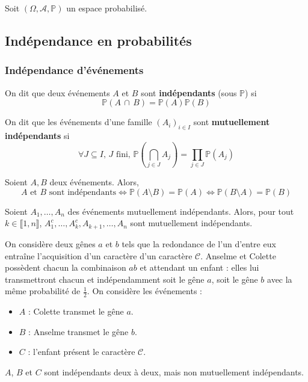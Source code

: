 



  Soit $(\Omega, \mathcal{A}, \mathbb{P})$ un espace probabilisé.

  \subsection{Indépendance en probabilités}

  \subsubsection{Indépendance d'événements}


  \begin{definition}
    On dit que deux événements $A$ et $B$ sont \textbf{indépendants} (sous $\mathbb{P}$) si
    \[ \mathbb{P}(A \, \cap \, B) = \mathbb{P}(A) \mathbb{P}(B) \]
  \end{definition}

  \begin{definition}
    On dit que les événements d'une famille $(A_i)_{i \in I}$ sont \textbf{mutuellement indépendants} si
    \[ \forall J \subseteq I, \, J \text{ fini}, \, \mathbb{P}\left( \bigcap_{j \in J} A_j \right) = \prod_{j \in J} \mathbb{P}(A_j) \]
  \end{definition}


  \begin{proposition}
    Soient $A, B$ deux événements. Alors,
    \[ A \text{ et } B \text{ sont indépendants} \iff \mathbb{P}(A \setminus B) = \mathbb{P}(A) \iff \mathbb{P}(B \setminus A) = \mathbb{P}(B) \]
  \end{proposition}

  \begin{proposition}
    Soient $A_1, \dots, A_n$ des événements mutuellement indépendants. Alors, pour tout $k \in \llbracket 1, n \rrbracket$, $A_1^c, \dots, A_k^c, A_{k+1}, \dots, A_n$ sont mutuellement indépendants.
  \end{proposition}

  \begin{example}
    On considère deux gênes $a$ et $b$ tels que la redondance de l'un d'entre eux entraîne l'acquisition d'un caractère d'un caractère $\mathcal{C}$. Anselme et Colette possèdent chacun la combinaison $ab$ et attendant un enfant : elles lui transmettront chacun et indépendamment soit le gêne $a$, soit le gêne $b$ avec la même probabilité de $\frac{1}{2}$. On considère les événements :
    \begin{itemize}
      \item $A$ : Colette transmet le gêne $a$.
      \item $B$ : Anselme transmet le gêne $b$.
      \item $C$ : l'enfant présent le caractère $\mathcal{C}$.
    \end{itemize}
    $A$, $B$ et $C$ sont indépendants deux à deux, mais non mutuellement indépendants.
  \end{example}

